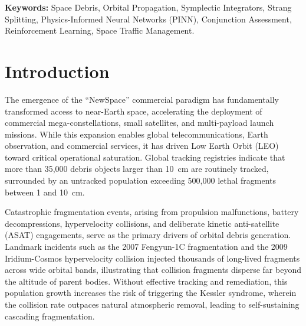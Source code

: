 \documentclass[12pt,letterpaper,twoside]{book}
\begin{document}
\vspace{0.8cm}
\noindent\textbf{Keywords:} Space Debris, Orbital Propagation, Symplectic Integrators, Strang Splitting, Physics-Informed Neural Networks (PINN), Conjunction Assessment, Reinforcement Learning, Space Traffic Management.

\cleardoublepage

\tableofcontents
\listoffigures
\listoftables

\cleardoublepage

\mainmatter

\chapter{Introduction}
\label{ch:introduction}

The emergence of the ``NewSpace'' commercial paradigm has fundamentally transformed access to near-Earth space, accelerating the deployment of commercial mega-constellations, small satellites, and multi-payload launch missions. While this expansion enables global telecommunications, Earth observation, and commercial services, it has driven Low Earth Orbit (LEO) toward critical operational saturation. Global tracking registries indicate that more than 35,000 debris objects larger than 10~cm are routinely tracked, surrounded by an untracked population exceeding 500,000 lethal fragments between 1 and 10~cm.

Catastrophic fragmentation events, arising from propulsion malfunctions, battery decompressions, hypervelocity collisions, and deliberate kinetic anti-satellite (ASAT) engagements, serve as the primary drivers of orbital debris generation. Landmark incidents such as the 2007 Fengyun-1C fragmentation and the 2009 Iridium-Cosmos hypervelocity collision injected thousands of long-lived fragments across wide orbital bands, illustrating that collision fragments disperse far beyond the altitude of parent bodies. Without effective tracking and remediation, this population growth increases the risk of triggering the Kessler syndrome, wherein the collision rate outpaces natural atmospheric removal, leading to self-sustaining cascading fragmentation.
\end{document}
